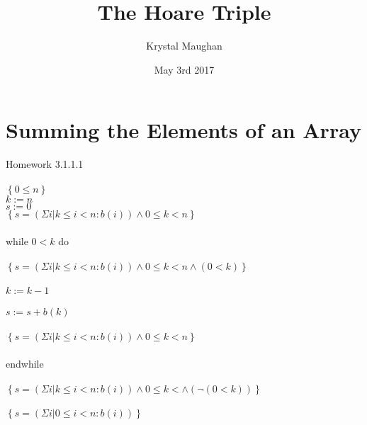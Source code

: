 \documentclass{article}
\title{The Hoare Triple}
\author{Krystal Maughan }
\date{May 3rd 2017}
\begin{document}
\maketitle

\section{Summing the Elements of an Array}
Homework 3.1.1.1
\\
\\
$\left\{0 \leq n\right\}$
\\
$k := n$
\\
$s := 0$
\\
$\left\{ s = (\Sigma i | k \leq i < n : b(i)) \land 0 \leq k < n\right\}$
\\
\\
while $ 0 < k $ do 
\\
\\
$\left\{ s = (\Sigma i | k \leq i < n : b(i)) \land 0 \leq k < n\land (0 < k) \right\}$
\\
\\
$k := k - 1$
\\
\\
$s := s + b(k)$
\\
\\
$\left\{ s = (\Sigma i | k \leq i < n : b(i)) \land 0 \leq k < n\right\}$
\\
\\
endwhile
\\
\\
$\left\{ s = (\Sigma i | k \leq i < n : b(i)) \land 0 \leq k <  \land (\neg(0 < k))\right\}$
\\
\\
$\left\{ s = (\Sigma i | 0 \leq i < n : b(i)) \right\}$
\\
\\
\end{document}
